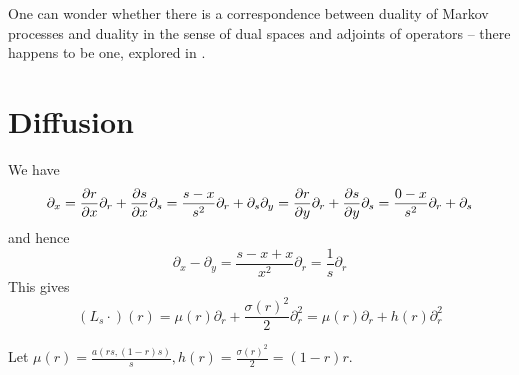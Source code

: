 \documentclass{article}
\begin{document}
One can wonder whether there is a correspondence between duality of Markov processes and duality in the sense of dual spaces and adjoints of operators -- there happens to be one, explored in \cite{jansen2014notion}. %




\section{Diffusion}

We have
\[
\partial_x
= \frac{\partial r}{\partial x}\partial_r + \frac{\partial s}{\partial x}\partial_s
= \frac{s - x}{s^2}\partial_r + \partial_s
\\\partial_y
= \frac{\partial r}{\partial y}\partial_r + \frac{\partial s}{\partial y}\partial_s
= \frac{0 - x}{s^2}\partial_r + \partial_s
\]
and hence
\[
\partial_x - \partial_y
= \frac{s - x + x}{x^2}\partial_r
= \frac{1}{s}\partial_r
\]
This gives
\[
(L_s \cdot)(r)
= \mu(r) \partial_r + \frac{\sigma(r)^2}{2} \partial_r^2
= \mu(r) \partial_r + h(r) \partial_r^2
\]

Let $\mu(r) = \frac{a(rs, (1-r)s)}{s}, h(r) = \frac{\sigma(r)^2}{2}=(1-r)r$.

\end{document}
